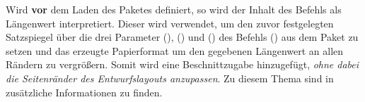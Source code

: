 \begin{Bundle*}{}
\begin{Declaration}{}
\printdeclarationlist%
%
Wird  \textbf{vor} dem Laden des Paketes 
definiert, so wird der Inhalt des Befehls als Längenwert interpretiert. Dieser 
wird verwendet, um den zuvor festgelegten Satzspiegel über die drei Parameter
(),
() und 
() des
Befehls () aus dem Paket  
zu setzen und das erzeugte Papierformat um den gegebenen Längenwert an allen 
Rändern zu vergrößern. Somit wird eine Beschnittzugabe hinzugefügt, \emph{ohne 
dabei die Seitenränder des Entwurfslayouts anzupassen}. Zu diesem Thema sind in 
 zusätzliche Informationen zu finden.
\end{Declaration}
%
\end{Bundle*}
